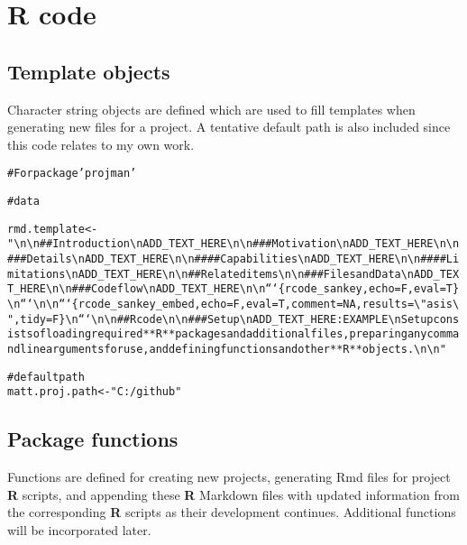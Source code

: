 \documentclass{article}\usepackage[]{graphicx}\usepackage[]{color}
\makeatletter
\newcommand{\hlstr}[1]{\textcolor[rgb]{0.863,0.196,0.184}{#1}}%
\newcommand{\hlcom}[1]{\textcolor[rgb]{0.345,0.431,0.459}{#1}}%
\newcommand{\hlstd}[1]{\textcolor[rgb]{0.514,0.58,0.588}{#1}}%
\newcommand{\hlkwb}[1]{\textcolor[rgb]{0.522,0.6,0}{#1}}%
\newenvironment{kframe}{%
 \def\at@end@of@kframe{}%
 \ifinner\ifhmode%
  \def\at@end@of@kframe{\end{minipage}}%
  \begin{minipage}{\columnwidth}%
 \fi\fi%
 \def\FrameCommand##1{\hskip\@totalleftmargin \hskip-\fboxsep
 \colorbox{shadecolor}{##1}\hskip-\fboxsep
     \hskip-\linewidth \hskip-\@totalleftmargin \hskip\columnwidth}%
 \MakeFramed {\advance\hsize-\width
   \@totalleftmargin\z@ \linewidth\hsize
   \@setminipage}}%
 {\par\unskip\endMakeFramed%
 \at@end@of@kframe}
\newenvironment{knitrout}{}{} %
\makeatother
\begin{document}
\section{\textbf{R} code}

\subsection{Template objects}
Character string objects are defined which are used to fill templates when generating new files for a project.
A tentative default path is also included since this code relates to my own work.

\begin{knitrout}
\color{fgcolor}\begin{kframe}
\begin{alltt}
\hlcom{# For package 'projman'}

\hlcom{# data}

\hlstd{rmd.template} \hlkwb{<-} \hlstr{"\textbackslash{}n\textbackslash{}n## Introduction\textbackslash{}nADD_TEXT_HERE\textbackslash{}n\textbackslash{}n### Motivation\textbackslash{}nADD_TEXT_HERE\textbackslash{}n\textbackslash{}n### Details\textbackslash{}nADD_TEXT_HERE\textbackslash{}n\textbackslash{}n#### Capabilities\textbackslash{}nADD_TEXT_HERE\textbackslash{}n\textbackslash{}n#### Limitations\textbackslash{}nADD_TEXT_HERE\textbackslash{}n\textbackslash{}n## Related items\textbackslash{}n\textbackslash{}n### Files and Data\textbackslash{}nADD_TEXT_HERE\textbackslash{}n\textbackslash{}n### Code flow\textbackslash{}nADD_TEXT_HERE\textbackslash{}n\textbackslash{}n```\{r code_sankey, echo=F, eval=T\}\textbackslash{}n```\textbackslash{}n\textbackslash{}n```\{r code_sankey_embed, echo=F, eval=T, comment=NA, results=\textbackslash{}"asis\textbackslash{}", tidy=F\}\textbackslash{}n```\textbackslash{}n\textbackslash{}n## R code\textbackslash{}n\textbackslash{}n### Setup\textbackslash{}nADD_TEXT_HERE: EXAMPLE\textbackslash{}nSetup consists of loading required **R** packages and additional files, preparing any command line arguments for use, and defining functions and other **R** objects.\textbackslash{}n\textbackslash{}n"}

\hlcom{# default path}
\hlstd{matt.proj.path} \hlkwb{<-} \hlstr{"C:/github"}
\end{alltt}
\end{kframe}
\end{knitrout}

\subsection{Package functions}
Functions are defined for creating new projects, generating Rmd files for project \textbf{R} scripts,
and appending these \textbf{R} Markdown files with updated information from the corresponding \textbf{R} scripts as their development continues.
Additional functions will be incorporated later.
\end{document}
